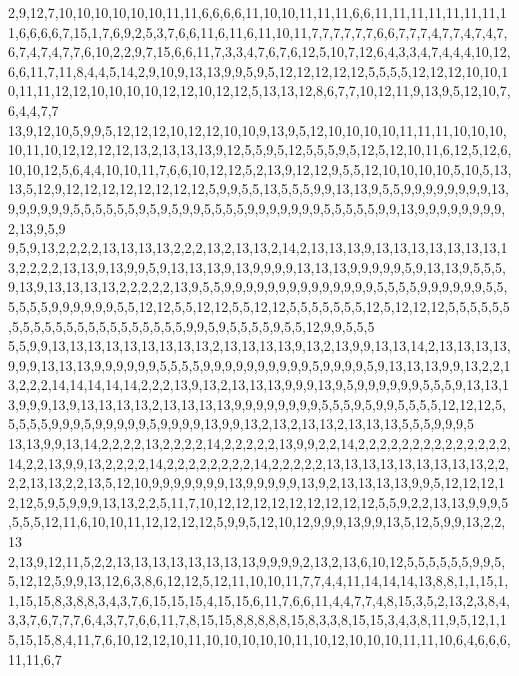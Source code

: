 2,9,12,7,10,10,10,10,10,10,11,11,6,6,6,6,11,10,10,11,11,11,6,6,11,11,11,11,11,11,11,11,6,6,6,6,7,15,1,7,6,9,2,5,3,7,6,6,11,6,11,6,11,10,11,7,7,7,7,7,7,6,6,7,7,7,4,7,7,4,7,4,7,6,7,4,7,4,7,7,6,10,2,2,9,7,15,6,6,11,7,3,3,4,7,6,7,6,12,5,10,7,12,6,4,3,3,4,7,4,4,4,10,12,6,6,11,7,11,8,4,4,5,14,2,9,10,9,13,13,9,9,5,9,5,12,12,12,12,12,5,5,5,5,12,12,12,10,10,10,11,11,12,12,10,10,10,10,12,12,10,12,12,5,13,13,12,8,6,7,7,10,12,11,9,13,9,5,12,10,7,6,4,4,7,7
13,9,12,10,5,9,9,5,12,12,12,10,12,12,10,10,9,13,9,5,12,10,10,10,10,11,11,11,10,10,10,10,11,10,12,12,12,12,13,2,13,13,13,9,12,5,5,9,5,12,5,5,5,9,5,12,5,12,10,11,6,12,5,12,6,10,10,12,5,6,4,4,10,10,11,7,6,6,10,12,12,5,2,13,9,12,12,9,5,5,12,10,10,10,10,5,10,5,13,13,5,12,9,12,12,12,12,12,12,12,12,5,9,9,5,5,13,5,5,5,9,9,13,13,9,5,5,9,9,9,9,9,9,9,9,13,9,9,9,9,9,9,5,5,5,5,5,5,9,5,9,5,9,9,5,5,5,5,9,9,9,9,9,9,9,5,5,5,5,5,9,9,13,9,9,9,9,9,9,9,9,2,13,9,5,9
9,5,9,13,2,2,2,2,13,13,13,13,2,2,2,13,2,13,13,2,14,2,13,13,13,9,13,13,13,13,13,13,13,13,2,2,2,2,13,13,9,13,9,9,5,9,13,13,13,9,13,9,9,9,9,13,13,13,9,9,9,9,9,5,9,13,13,9,5,5,5,9,13,9,13,13,13,13,2,2,2,2,2,13,9,5,5,9,9,9,9,9,9,9,9,9,9,9,9,9,9,5,5,5,5,9,9,9,9,9,9,5,5,5,5,5,5,9,9,9,9,9,9,5,5,12,12,5,5,12,12,5,5,12,12,5,5,5,5,5,5,5,12,5,12,12,12,5,5,5,5,5,5,5,5,5,5,5,5,5,5,5,5,5,5,5,5,5,5,9,9,5,9,5,5,5,5,9,5,5,12,9,9,5,5,5
5,5,9,9,13,13,13,13,13,13,13,13,13,2,13,13,13,13,9,13,2,13,9,9,13,13,14,2,13,13,13,13,9,9,9,13,13,13,9,9,9,9,9,9,5,5,5,5,9,9,9,9,9,9,9,9,9,9,5,9,9,9,9,5,9,13,13,13,9,9,13,2,2,13,2,2,2,14,14,14,14,14,2,2,2,13,9,13,2,13,13,13,9,9,9,13,9,5,9,9,9,9,9,9,5,5,5,9,13,13,13,9,9,9,13,9,13,13,13,13,2,13,13,13,13,9,9,9,9,9,9,9,9,5,5,5,9,5,9,9,5,5,5,5,12,12,12,5,5,5,5,5,9,9,9,5,9,9,9,9,9,5,9,9,9,9,13,9,9,13,2,13,2,13,13,2,13,13,13,5,5,5,9,9,9,5
13,13,9,9,13,14,2,2,2,2,13,2,2,2,2,14,2,2,2,2,2,13,9,9,2,2,14,2,2,2,2,2,2,2,2,2,2,2,2,2,2,14,2,2,13,9,9,13,2,2,2,2,14,2,2,2,2,2,2,2,2,14,2,2,2,2,2,13,13,13,13,13,13,13,13,13,2,2,2,2,13,13,2,2,13,5,12,10,9,9,9,9,9,9,9,13,9,9,9,9,9,13,9,2,13,13,13,13,9,9,5,12,12,12,12,12,5,9,5,9,9,9,13,13,2,2,5,11,7,10,12,12,12,12,12,12,12,12,12,5,5,9,2,2,13,13,9,9,9,5,5,5,5,12,11,6,10,10,11,12,12,12,12,5,9,9,5,12,10,12,9,9,9,13,9,9,13,5,12,5,9,9,13,2,2,13
2,13,9,12,11,5,2,2,13,13,13,13,13,13,13,13,9,9,9,9,2,13,2,13,6,10,12,5,5,5,5,5,5,9,9,5,5,12,12,5,9,9,13,12,6,3,8,6,12,12,5,12,11,10,10,11,7,7,4,4,11,14,14,14,13,8,8,1,1,15,1,1,15,15,8,3,8,8,3,4,3,7,6,15,15,15,4,15,15,6,11,7,6,6,11,4,4,7,7,4,8,15,3,5,2,13,2,3,8,4,3,3,7,6,7,7,7,6,4,3,7,7,6,6,11,7,8,15,15,8,8,8,8,8,15,8,3,3,8,15,15,3,4,3,8,11,9,5,12,1,15,15,15,8,4,11,7,6,10,12,12,10,11,10,10,10,10,10,11,10,12,10,10,10,11,11,10,6,4,6,6,6,11,11,6,7
